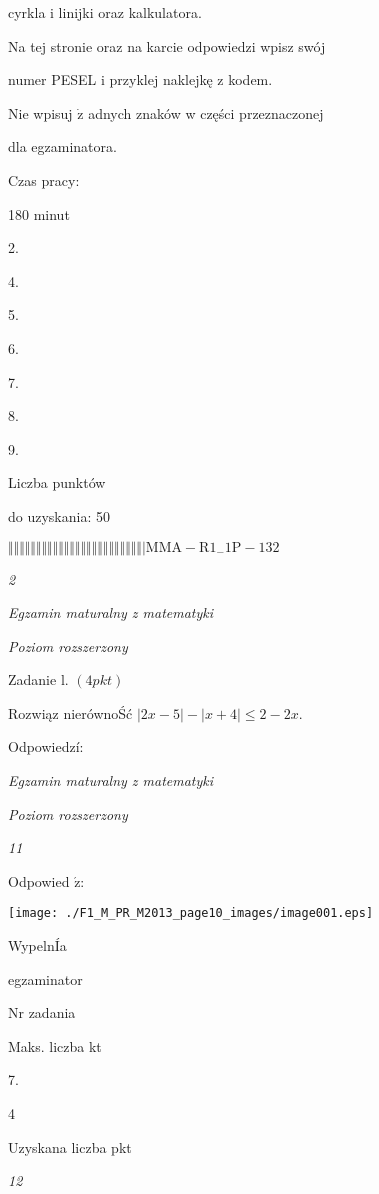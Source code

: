 \documentclass[a4paper,12pt]{article}
\begin{document}
cyrkla i linijki oraz kalkulatora.

Na tej stronie oraz na karcie odpowiedzi wpisz swój

numer PESEL i przyklej naklejkę z kodem.

Nie wpisuj $\dot{\mathrm{z}}$ adnych znaków w części przeznaczonej

dla egzaminatora.

Czas pracy:

180 minut

2.

4.

5.

6.

7.

8.

9.

Liczba punktów

do uzyskania: 50

$\Vert\Vert\Vert\Vert\Vert\Vert\Vert\Vert\Vert\Vert\Vert\Vert\Vert\Vert\Vert\Vert\Vert\Vert\Vert\Vert\Vert\Vert\Vert\Vert|  \mathrm{M}\mathrm{M}\mathrm{A}-\mathrm{R}1_{-}1\mathrm{P}-132$




{\it 2}

{\it Egzamin maturalny z matematyki}

{\it Poziom rozszerzony}

Zadanie l. $(4pkt)$

Rozwiąz nierównoŚć $|2x-5|-|x+4|\leq 2-2x.$

Odpowiedzí:





{\it Egzamin maturalny z matematyki}

{\it Poziom rozszerzony}

{\it 11}

Odpowied $\acute{\mathrm{z}}$:
\begin{center}
\texttt{[image: ./F1\_M\_PR\_M2013\_page10\_images/image001.eps]}
\end{center}
WypelnÍa

egzaminator

Nr zadania

Maks. liczba kt

7.

4

Uzyskana liczba pkt





{\it 12}
\end{document}
